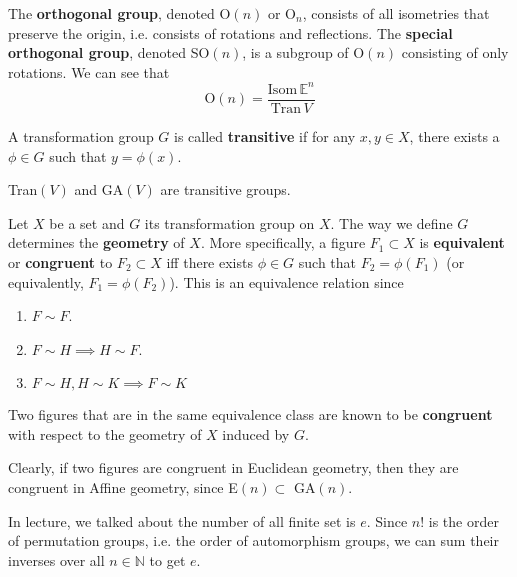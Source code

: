   \begin{definition}
    The \textbf{orthogonal group}, denoted O$(n)$ or O$_{n}$, consists of all isometries that preserve the origin, i.e. consists of rotations and reflections. The \textbf{special orthogonal group}, denoted SO$(n)$, is a subgroup of O$(n)$ consisting of only rotations. We can see that 
    \begin{equation}
      \text{O}(n)=\frac{\text{Isom}\, \mathbb{E}^{n}}{\text{Tran}\,V}
    \end{equation}
  \end{definition}

  \begin{definition}
    A transformation group $G$ is called \textbf{transitive} if for any $x, y \in X$, there exists a $\phi \in G$ such that $y = \phi(x)$. 
  \end{definition}

  \begin{example}
    Tran$(V)$ and GA$(V)$ are transitive groups. 
  \end{example}

  \begin{definition}
    Let $X$ be a set and $G$ its transformation group on $X$. The way we define $G$ determines the \textbf{geometry} of $X$. More specifically, a figure $F_{1} \subset X$ is \textbf{equivalent} or \textbf{congruent} to $F_{2} \subset X$ iff there exists $\phi \in G$ such that $F_{2} = \phi (F_{1})$ (or equivalently, $F_{1} = \phi (F_{2})$). This is an equivalence relation since
    \begin{enumerate}
      \item $F \sim F$. 
      \item $F \sim H \implies H \sim F$. 
      \item $F \sim H, H \sim K \implies F \sim K$
    \end{enumerate}
    Two figures that are in the same equivalence class are known to be \textbf{congruent} with respect to the geometry of $X$ induced by $G$. 
  \end{definition}

  Clearly, if two figures are congruent in Euclidean geometry, then they are congruent in Affine geometry, since E$(n) \subset$ GA$(n)$. 

  In lecture, we talked about the number of all finite set is $e$. Since $n!$ is the order of permutation groups, i.e. the order of automorphism groups, we can sum their inverses over all $n \in \mathbb{N}$ to get $e$. 

